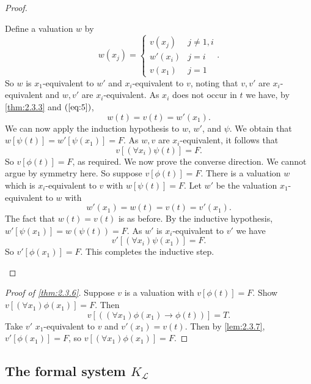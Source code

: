 \documentclass{article}
\newcommand{\rb}[1]{\left( #1 \right)}
\renewcommand{\sb}[1]{\left[ #1 \right]}
\newcommand{\impb}[2]{\rb{#1 \rightarrow #2}}
\newcommand{\fab}[1]{\rb{\forall #1}}
\theoremstyle{definition}\newtheorem{definition}{Definition}[subsection]
\theoremstyle{definition}\newtheorem{remark}[definition]{Remark}
\theoremstyle{definition}\newtheorem*{example}{Example}
\theoremstyle{definition}\newtheorem*{note}{Note}
\begin{document}
\begin{proof}
\begin{enumerate}
Define a valuation $ w $ by
$$ w\rb{x_j} = \begin{cases} v\rb{x_j} & j \ne 1, i \\ w'\rb{x_i} & j = i \\ v\rb{x_1} & j = 1 \end{cases}. $$
So $ w $ is $ x_1 $-equivalent to $ w' $ and $ x_i $-equivalent to $ v $, noting that $ v, v' $ are $ x_i $-equivalent and $ w, v' $ are $ x_i $-equivalent. As $ x_i $ does not occur in $ t $ we have, by \ref{thm:2.3.3} and $ \rb{\ref{eq:5}} $,
$$ w\rb{t} = v\rb{t} = w'\rb{x_1}. $$
We can now apply the induction hypothesis to $ w $, $ w' $, and $ \psi $. We obtain that $ w\sb{\psi\rb{t}} = w'\sb{\psi\rb{x_1}} = F $. As $ w, v $ are $ x_i $-equivalent, it follows that
$$ v\sb{\fab{x_i}\psi\rb{t}} = F. $$
So $ v\sb{\phi\rb{t}} = F $, as required. We now prove the converse direction. We cannot argue by symmetry here. So suppose $ v\sb{\phi\rb{t}} = F $. There is a valuation $ w $ which is $ x_i $-equivalent to $ v $ with $ w\sb{\psi\rb{t}} = F $. Let $ w' $ be the valuation $ x_1 $-equivalent to $ w $ with
$$ w'\rb{x_1} = w\rb{t} = v\rb{t} = v'\rb{x_1}. $$
The fact that $ w\rb{t} = v\rb{t} $ is as before. By the inductive hypothesis, $ w'\sb{\psi\rb{x_1}} = w\rb{\psi\rb{t}} = F $. As $ w' $ is $ x_i $-equivalent to $ v' $ we have
$$ v'\sb{\fab{x_i}\psi\rb{x_1}} = F. $$
So $ v'\sb{\phi\rb{x_1}} = F $. This completes the inductive step.
\end{enumerate}
\end{proof}

\begin{proof}[Proof of \ref{thm:2.3.6}]
Suppose $ v $ is a valuation with $ v\sb{\phi\rb{t}} = F $. Show $ v\sb{\fab{x_1}\phi\rb{x_1}} = F $. Then
$$ v\sb{\impb{\fab{x_1}\phi\rb{x_1}}{\phi\rb{t}}} = T. $$
Take $ v' $ $ x_1 $-equivalent to $ v $ and $ v'\rb{x_1} = v\rb{t} $. Then by \ref{lem:2.3.7}, $ v'\sb{\phi\rb{x_1}} = F $, so $ v\sb{\fab{x_1}\phi\rb{x_1}} = F $.
\end{proof}

\subsection{The formal system $ K_\mathcal{L} $}
\end{document}
